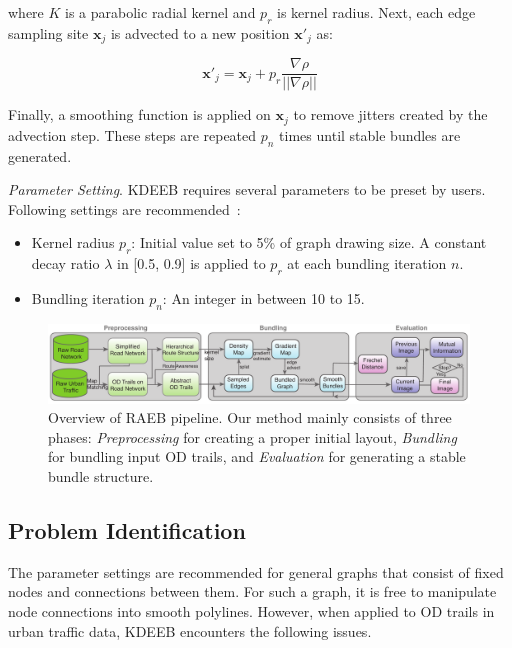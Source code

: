where $K$ is a parabolic radial kernel and $p_r$ is kernel radius.
Next, each edge sampling site $\textbf{x}_j$ is advected to a new position $\textbf{x}'_j$ as:

\vspace{-5mm}
\begin{equation}\label{eq:advecting_points}
\textbf{x}'_j = \textbf{x}_j + p_r \frac{\nabla \rho}{||\nabla \rho||}
\end{equation}

Finally, a smoothing function is applied on $\textbf{x}_j$ to remove jitters created by the advection step.
These steps are repeated $p_n$ times until stable bundles are generated.

\vspace{2mm}
\noindent
\textit{Parameter Setting}.
KDEEB requires several parameters to be preset by users.
Following settings are recommended~\cite{van2016cubu}:
\begin{itemize}

\item 
Kernel radius $p_r$: Initial value set to 5\% of graph drawing size.
A constant decay ratio $\lambda$ in [0.5, 0.9] is applied to $p_r$ at each bundling iteration $n$.

\item
Bundling iteration $p_n$: An integer in between 10 to 15.

\end{itemize}

\begin{figure}[t]
	\centering
	\includegraphics[width=0.995\textwidth]{figure/edgebundling/fig3_framework/framework2.pdf}
	\vspace{-3mm}
	\caption{Overview of RAEB pipeline.
	Our method mainly consists of three phases: \textit{Preprocessing} for creating a proper initial layout, \textit{Bundling} for bundling input OD trails, and \textit{Evaluation} for generating a stable bundle structure.}
	\label{fig:framework}
	\vspace{-4mm}
\end{figure}

\subsection{Problem Identification}
The parameter settings are recommended for general graphs that consist of fixed nodes and connections between them.
For such a graph, it is free to manipulate node connections into smooth polylines.
However, when applied to OD trails in urban traffic data, KDEEB encounters the following issues.

